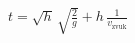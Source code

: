\documentclass[preview]{standalone}
\begin{document}
\begin{align*}
t = \sqrt{h} \, \sqrt{\frac{2}{g}} + h \, \frac{1}{v_{\text{zvuk}}}
\end{align*}
\end{document}
